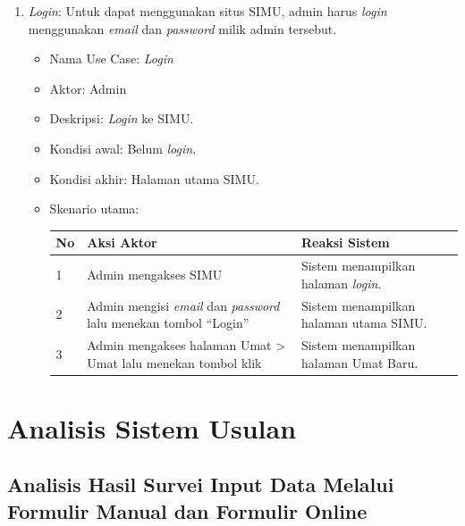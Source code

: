 \begin{enumerate}
	\item \textit{Login}: Untuk dapat menggunakan situs SIMU, admin harus \textit{login} menggunakan \textit{email} dan \textit{password} milik admin tersebut.
	\begin{itemize}
		\item Nama Use Case: \textit{Login}
		\item Aktor: Admin
		\item Deskripsi: \textit{Login} ke SIMU.
		\item Kondisi awal: Belum \textit{login}.
		\item Kondisi akhir: Halaman utama SIMU.
		\item Skenario utama:
		\begin{table}[h!]
			\centering
			\label{}
			\begin{tabular}{ | m{0.5cm} | m{7cm}| m{6cm} | } 
				\hline
				No & Aksi Aktor & Reaksi Sistem \\ 
				\hline
				1 & Admin mengakses SIMU & Sistem menampilkan halaman \textit{login}.
				\\ 
				\hline
				2 & Admin mengisi \textit{email} dan \textit{password} lalu menekan tombol ``Login'' & Sistem menampilkan halaman utama SIMU.
				\\ 
				\hline
				3 & Admin mengakses halaman Umat > Umat lalu menekan tombol klik & Sistem menampilkan halaman Umat Baru.
				\\ 
				\hline
			\end{tabular}
		\end{table}
	\end{itemize}
\end{enumerate}
\newpage


\section{Analisis Sistem Usulan}
\label{sec:analisisSistemusulan}

\subsection{Analisis Hasil Survei Input Data Melalui Formulir Manual dan Formulir Online}

